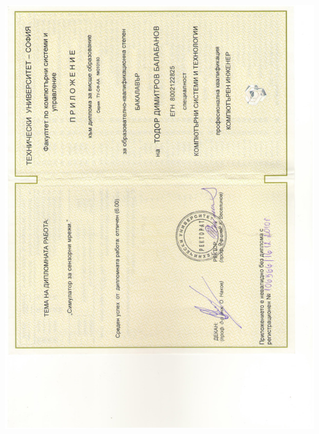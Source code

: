 \documentclass[english,a4paper]{europasscv}
\begin{document}
\includegraphics[width=\textwidth,height=\textheight,keepaspectratio]{DiplomaTU2010_3}
\end{document}

